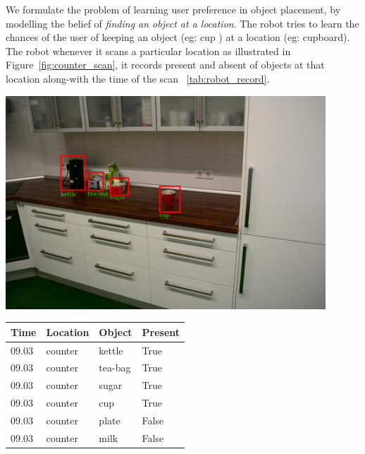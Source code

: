 We formulate the problem of learning user preference in object placement, by modelling the belief of \emph{finding an object at a location}. The robot tries to learn the chances of the user of keeping an object (eg: cup ) at a location (eg: cupboard). The robot whenever it scans a particular location as illustrated in Figure~\ref{fig:counter_scan}, it records present and absent of objects at that location along-with the time of the scan ~\ref{tab:robot_record}.
  
  
  \begin{minipage}{\textwidth}
  \begin{minipage}[b]{0.49\textwidth}
    \centering
        \includegraphics[width=0.9\textwidth]{images/counter_ano.png}

    \label{fig:counter_scan}
  \end{minipage}
  \hfill
  \begin{minipage}[b]{0.49\textwidth}
    \centering
    \begin{tabular}{|l|l|l|l|}
        \hline
	        Time & Location & Object & Present\\
        \hline
        \hline
	        09.03 & counter & kettle & True\\
        \hline
	        09.03 & counter & tea-bag & True\\
        \hline
	        09.03 & counter & sugar & True\\
        \hline
	        09.03 & counter & cup & True\\
        \hline
	        09.03 & counter & plate & False\\
        \hline
	        09.03 & counter & milk & False\\
        \hline
        \end{tabular}
      \label{tab:robot_record}
    \end{minipage}
  \end{minipage}


